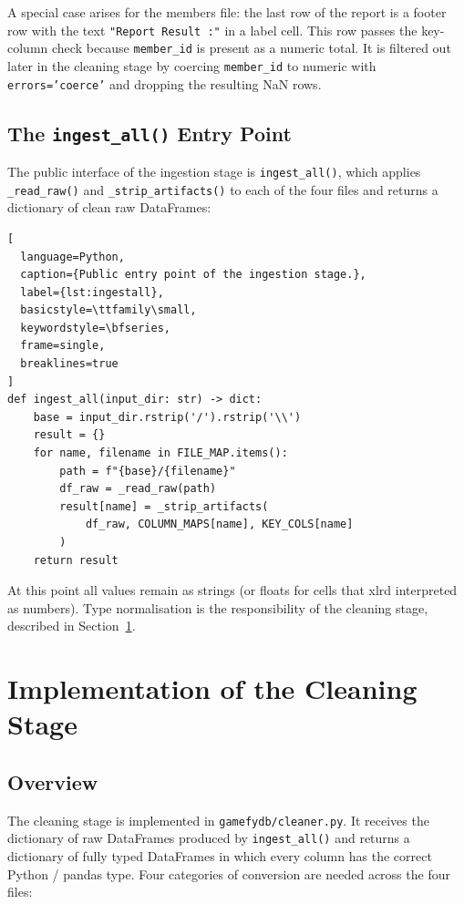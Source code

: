 A special case arises for the members file: the last row of the report is a
footer row with the text \texttt{"Report Result\,:"} in a label cell. This row
passes the key-column check because \texttt{member\_id} is present as a numeric
total. It is filtered out later in the cleaning stage by coercing \texttt{member\_id}
to numeric with \texttt{errors='coerce'} and dropping the resulting NaN rows.

\subsection{The \texttt{ingest\_all()} Entry Point}

The public interface of the ingestion stage is \texttt{ingest\_all()}, which
applies \texttt{\_read\_raw()} and \texttt{\_strip\_artifacts()} to each of the
four files and returns a dictionary of clean raw DataFrames:

\begin{lstlisting}[
  language=Python,
  caption={Public entry point of the ingestion stage.},
  label={lst:ingestall},
  basicstyle=\ttfamily\small,
  keywordstyle=\bfseries,
  frame=single,
  breaklines=true
]
def ingest_all(input_dir: str) -> dict:
    base = input_dir.rstrip('/').rstrip('\\')
    result = {}
    for name, filename in FILE_MAP.items():
        path = f"{base}/{filename}"
        df_raw = _read_raw(path)
        result[name] = _strip_artifacts(
            df_raw, COLUMN_MAPS[name], KEY_COLS[name]
        )
    return result
\end{lstlisting}

At this point all values remain as strings (or floats for cells that xlrd
interpreted as numbers). Type normalisation is the responsibility of the cleaning
stage, described in Section~\ref{sec:cleaning}.

\section{Implementation of the Cleaning Stage}
\label{sec:cleaning}

\subsection{Overview}

The cleaning stage is implemented in \texttt{gamefydb/cleaner.py}. It receives
the dictionary of raw DataFrames produced by \texttt{ingest\_all()} and returns
a dictionary of fully typed DataFrames in which every column has the correct
Python / pandas type. Four categories of conversion are needed across the four
files:

